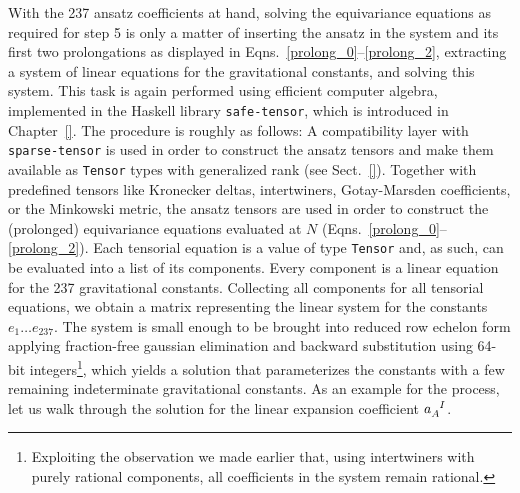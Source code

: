 With the 237 ansatz coefficients at hand, solving the equivariance equations as required for step 5 is only a matter of inserting the ansatz in the system and its first two prolongations as displayed in Eqns.~\ref{prolong_0}--\ref{prolong_2}, extracting a system of linear equations for the gravitational constants, and solving this system. This task is again performed using efficient computer algebra, implemented in the Haskell library \texttt{safe-tensor}, which is introduced in Chapter~\ref{}. The procedure is roughly as follows: A compatibility layer with \texttt{sparse-tensor} is used in order to construct the ansatz tensors and make them available as \texttt{Tensor} types with generalized rank (see Sect.~\ref{}). Together with predefined tensors like Kronecker deltas, intertwiners, Gotay-Marsden coefficients, or the Minkowski metric, the ansatz tensors are used in order to construct the (prolonged) equivariance equations evaluated at $N$ (Eqns.~\ref{prolong_0}--\ref{prolong_2}). Each tensorial equation is a value of type \texttt{Tensor} and, as such, can be evaluated into a list of its components. Every component is a linear equation for the 237 gravitational constants. Collecting all components for all tensorial equations, we obtain a matrix representing the linear system for the constants $e_1\dots e_{237}$. The system is small enough to be brought into reduced row echelon form applying fraction-free gaussian elimination and backward substitution using 64-bit integers\footnote{Exploiting the observation we made earlier that, using intertwiners with purely rational components, all coefficients in the system remain rational.}, which yields a solution that parameterizes the constants with a few remaining indeterminate gravitational constants. As an example for the process, let us walk through the solution for the linear expansion coefficient $a_A^{\hphantom AI}$.

